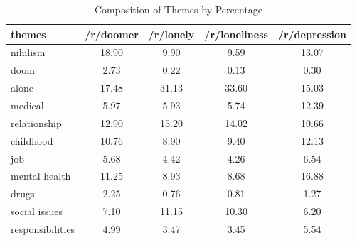 \documentclass[../report.tex]{subfiles}
\begin{document}
\begin{table*}[ht]
		\centering
		\begin{tabular}{| l | c | c | c | c |}
			\toprule
			themes & /r/doomer & /r/lonely & /r/loneliness & /r/depression \\
			\midrule
\multicolumn{1}{|p{4cm}|}{nihilism} & 18.90 & 9.90 & 9.59 & 13.07 \\
\multicolumn{1}{|p{4cm}|}{doom} & 2.73 & 0.22 & 0.13 & 0.30 \\
\multicolumn{1}{|p{4cm}|}{alone} & 17.48 & 31.13 & 33.60 & 15.03 \\
\multicolumn{1}{|p{4cm}|}{medical} & 5.97 & 5.93 & 5.74 & 12.39 \\
\multicolumn{1}{|p{4cm}|}{relationship} & 12.90 & 15.20 & 14.02 & 10.66 \\
\multicolumn{1}{|p{4cm}|}{childhood} & 10.76 & 8.90 & 9.40 & 12.13 \\
\multicolumn{1}{|p{4cm}|}{job} & 5.68 & 4.42 & 4.26 & 6.54 \\
\multicolumn{1}{|p{4cm}|}{mental health} & 11.25 & 8.93 & 8.68 & 16.88 \\
\multicolumn{1}{|p{4cm}|}{drugs} & 2.25 & 0.76 & 0.81 & 1.27 \\
\multicolumn{1}{|p{4cm}|}{social issues} & 7.10 & 11.15 & 10.30 & 6.20 \\
\multicolumn{1}{|p{4cm}|}{responsibilities} & 4.99 & 3.47 & 3.45 & 5.54 \\
			\bottomrule
		\end{tabular}
		\caption{Composition of Themes by Percentage}
		\label{tab:composition}
\end{table*}
\end{document}
